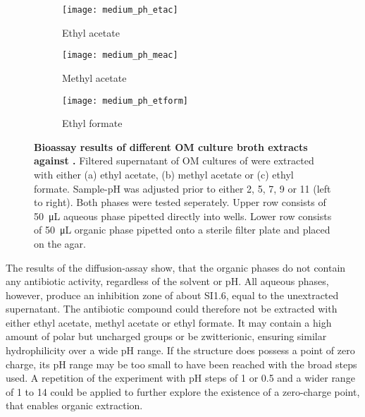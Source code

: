 \begin{figure}[htbp]
	\centering
	\begin{subfigure}{\textwidth}
		\centering
		\texttt{[image: medium\_ph\_etac]}
		\caption{Ethyl acetate}
	\end{subfigure}
	\begin{subfigure}{\textwidth}
		\centering
		\texttt{[image: medium\_ph\_meac]}
		\caption{Methyl acetate}
	\end{subfigure}
	\begin{subfigure}{\textwidth}
		\centering
		\texttt{[image: medium\_ph\_etform]}
		\caption{Ethyl formate}
	\end{subfigure}
	\caption[Bioassay results of different OM culture broth extracts against \coli]{%
		\textbf{Bioassay results of different OM culture broth extracts against \coli{}.} Filtered supernatant of OM cultures of \tue were extracted with either (a) ethyl acetate, (b) methyl acetate or (c) ethyl formate.
    	Sample-pH was adjusted prior to either 2, 5, 7, 9 or 11 (left to right).
    	Both phases were tested seperately.
    	Upper row consists of \SI{50}{\micro\liter} aqueous phase pipetted directly into wells.
    	Lower row consists of \SI{50}{\micro\liter} organic phase pipetted onto a sterile filter plate and placed on the agar.}
	\label{fig:results_extraction_bioassay}
\end{figure}

The results of the diffusion-assay show, that the organic phases do not contain any antibiotic activity, regardless of the solvent or pH.
All aqueous phases, however, produce an inhibition zone of about SI{1.6}{\centi\metre}, equal to the unextracted supernatant.
The antibiotic compound could therefore not be extracted with either ethyl acetate, methyl acetate or ethyl formate.
It may contain a high amount of polar but uncharged groups or be zwitterionic, ensuring similar hydrophilicity over a wide pH range.
If the structure does possess a point of zero charge, its pH range may be too small to have been reached with the broad steps used.
A repetition of the experiment with pH steps of 1 or 0.5 and a wider range of 1 to 14 could be applied to further explore the existence of a zero-charge point, that enables organic extraction.

